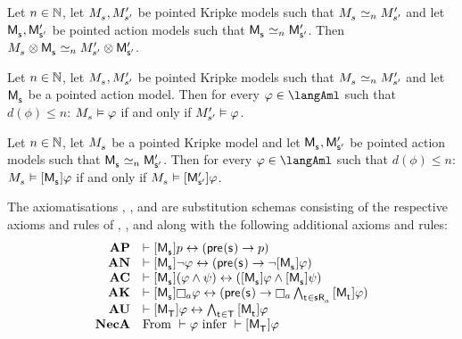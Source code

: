 \begin{proposition}
Let $n \in \mathbb{N}$,
let $\kPModel{\kStateS}, \kPModelP{\kStateSP}$ be pointed Kripke models such that $\kPModel{\kStateS} \bisimilar[n] \kPModelP{\kStateSP}$ and
let $\aPModel{\aStateS}, \aPModelP{\aStateSP}$ be pointed action models such that $\aPModel{\aStateS} \bisimilar[n] \aPModelP{\aStateSP}$.
Then $\kPModel{\kStateS} \exec \aPModel{\aStateS} \bisimilar[n] \kPModelP{\kStateSP} \exec \aPModelP{\aStateSP}$.
\end{proposition}

\begin{proposition}
Let $n \in \mathbb{N}$,
let $\kPModel{\kStateS}, \kPModelP{\kStateSP}$ be pointed Kripke models such that $\kPModel{\kStateS} \bisimilar[n] \kPModelP{\kStateSP}$ and
let $\aPModel{\aStateS}$ be a pointed action model.
Then for every $\phi \in \langAml$ such that $d(\phi) \leq n$: $\kPModel{\kStateS} \entails \phi$ if and only if ${M^{\prime}_{{{s}^{\prime}}}} \vDash \varphi$.
\end{proposition}

\begin{proposition}
Let $n \in \mathbb{N}$,
let $\kPModel{\kStateS}$ be a pointed Kripke model and
let $\aPModel{\aStateS}, \aPModelP{\aStateSP}$ be pointed action models such that $\aPModel{\aStateS} \bisimilar[n] \aPModelP{\aStateSP}$.
Then for every $\phi \in \langAml$ such that $d(\phi) \leq n$: $\kPModel{\kStateS} \entails \actionA{\aPModel{\aStateS}} \phi$ if and only if $\kPModel{\kStateS} \entails \actionA{\aPModelP{\aStateSP}} \phi$.
\end{proposition}

\begin{definition}
The axiomatisations \axiomAmlK{}, \axiomAmlKFF{}, and \axiomAmlS{} are substitution schemas consisting of the respective axioms and rules of \axiomK{}, \axiomKFF{}, and \axiomS{} along with the following additional axioms and rules:
$$
\begin{array}{rl}
    {\bf AP} & \proves \actionA{\aPModel{\aStateS}} \atomP \iff (\aPrecondition(\aStateS) \implies \atomP)\\
    {\bf AN} & \proves \actionA{\aPModel{\aStateS}} \lnot \phi \iff (\aPrecondition(\aStateS) \implies \lnot \actionA{\aPModel{\aStateS}} \phi)\\
    {\bf AC} & \proves \actionA{\aPModel{\aStateS}} (\phi \land \psi) \iff (\actionA{\aPModel{\aStateS}} \phi \land \actionA{\aPModel{\aStateS}} \psi)\\
    {\bf AK} & \proves \actionA{\aPModel{\aStateS}} \necessaryA \phi \iff (\aPrecondition(\aStateS) \implies \necessaryA \bigwedge_{\aStateT \in \aSuccessorsA{\aStateS}} \actionA{\aPModel{\aStateT}} \phi)\\
    {\bf AU} & \proves \actionA{\aPModel{\aStatesT}} \phi \iff \bigwedge_{\aStateT \in \aStatesT} \actionA{\aPModel{\aStateT}} \phi\\
    {\bf NecA} & \text{From } \proves \phi \text{ infer } \proves \actionA{\aPModel{\aStatesT}} \phi
\end{array}
$$
\end{definition}

